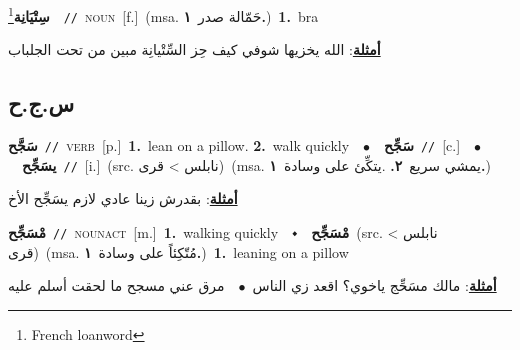 \documentclass[10pt,a4paper,twoside]{article} %
\begin{document}
\begin{multicols}{2}
{\setlength\topsep{0pt}\textbf{\foreignlanguage{arabic}{سِتْيَانِة}}\footnote{French loanword}\ \ {\color{gray}\texttt{//}\color{black}}\ \textsc{noun}\ [f.]\ \color{gray}(msa. \foreignlanguage{arabic}{حَمّالة صدر}~\foreignlanguage{arabic}{\textbf{١.}})\color{black}\ \textbf{1.}~bra\  \begin{flushright}\color{gray}\foreignlanguage{arabic}{\textbf{\underline{\foreignlanguage{arabic}{أمثلة}}}: الله يخزيها شوفي كيف حِز السِّتْيانِة مبين من تحت الجلباب}\end{flushright}\color{black}} \vspace{2mm}

\vspace{-3mm}
\subsection*{\color{blue}\foreignlanguage{arabic}{س.ج.ح}\color{blue}{}} 

{\setlength\topsep{0pt}\textbf{\foreignlanguage{arabic}{سَجَّح}}\ {\color{gray}\texttt{//}\color{black}}\ \textsc{verb}\ [p.]\ \textbf{1.}~lean on a pillow.  \textbf{2.}~walk quickly\ \ $\bullet$\ \ \setlength\topsep{0pt}\textbf{\foreignlanguage{arabic}{سَجِّح}}\ {\color{gray}\texttt{//}\color{black}}\ [c.]\ \ $\bullet$\ \ \setlength\topsep{0pt}\textbf{\foreignlanguage{arabic}{يسَجِّح}}\ {\color{gray}\texttt{//}\color{black}}\ [i.]\ (src. \color{gray}\foreignlanguage{arabic}{نابلس > قرى}\color{black})\ \color{gray}(msa. \foreignlanguage{arabic}{يمشي سريع}~\foreignlanguage{arabic}{\textbf{٢.}}  .\foreignlanguage{arabic}{يتكِّئ على وسادة}~\foreignlanguage{arabic}{\textbf{١.}})\color{black}\  \begin{flushright}\color{gray}\foreignlanguage{arabic}{\textbf{\underline{\foreignlanguage{arabic}{أمثلة}}}: بقدرش زينا عادي لازم يسَجِّح الأخ}\end{flushright}\color{black}} \vspace{2mm}

{\setlength\topsep{0pt}\textbf{\foreignlanguage{arabic}{مْسَجِّح}}\ {\color{gray}\texttt{//}\color{black}}\ \textsc{noun\textunderscore act}\ [m.]\ \textbf{1.}~walking quickly\ \ $\smblkdiamond$\ \ \setlength\topsep{0pt}\textbf{\foreignlanguage{arabic}{مْسَجِّح}}\ (src. \color{gray}\foreignlanguage{arabic}{نابلس > قرى}\color{black})\ \color{gray}(msa. \foreignlanguage{arabic}{مُتّكِئاً على وسادة}~\foreignlanguage{arabic}{\textbf{١.}})\color{black}\ \textbf{1.}~leaning on a pillow\  \begin{flushright}\color{gray}\foreignlanguage{arabic}{\textbf{\underline{\foreignlanguage{arabic}{أمثلة}}}: مالك مسَحِّج ياخوي؟ اقعد زي الناس\ $\bullet$\ \  مرق عني مسجح ما لحقت أسلم عليه}\end{flushright}\color{black}} \vspace{2mm}


\end{multicols}
\end{document}
